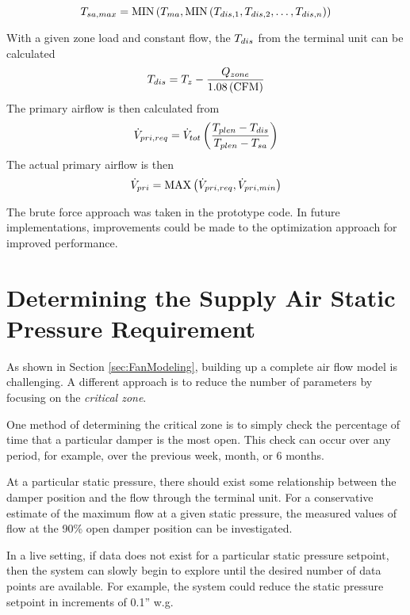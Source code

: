 \begin{equation}
    T_{sa,max} = \text{MIN}\left(T_{ma}, \text{MIN}\left(T_{dis,1}, T_{dis,2}, \ldots, T_{dis,n} \right) \right)
\end{equation}

With a given zone load and constant flow, the \(T_{dis}\) from the terminal
unit can be calculated 
\begin{equation}
    T_{dis} = T_{z} -  \frac{Q_{zone}}{1.08 \left( \text{CFM} \right)   }
\end{equation}
The primary airflow is then calculated from
\begin{equation}
    \dot{V}_{pri, req} = \dot{V}_{tot} \left( \frac{T_{plen} - T_{dis} }{T_{plen} - T_{sa}} \right) 
\end{equation}
The actual primary airflow is then 
\begin{equation}
    \dot{V}_{pri} = \text{MAX}\left(\dot{V}_{pri, req}, \dot{V}_{pri, min}  \right)
\end{equation}

The brute force approach was taken in the prototype code. In future implementations,
improvements could be made to the optimization approach for improved 
performance. 

\section{Determining the Supply Air Static Pressure Requirement}

As shown in Section \ref{sec:FanModeling}, building up a complete air
flow model is challenging. A different approach is to reduce the number
of parameters by focusing on the \textit{critical zone}. 

One method of determining the critical zone is to simply check the
percentage of time that a particular damper is the most open. This check
can occur over any period, for example, over the previous week, month,
or 6 months.

At a particular static pressure, there should exist some relationship
between the damper position and the flow through the terminal unit. For
a conservative estimate of the maximum flow at a given static pressure,
the measured values of flow at the 90\% open damper position can be
investigated. 

In a live setting, if data does not exist for a particular static
pressure setpoint, then the system can slowly begin to explore until the
desired number of data points are available. For example, the system
could reduce the static pressure setpoint in increments of 0.1'' w.g. 




